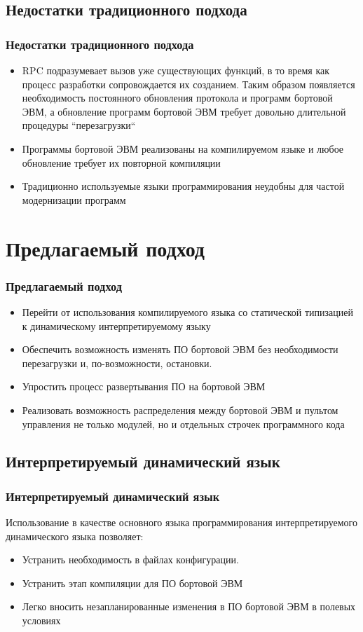 \documentclass{beamer}
\begin{document}
\subsection{Недостатки традиционного подхода}
\begin{frame}
\frametitle{Недостатки традиционного подхода}
\begin{itemize}
  \item<1-> RPC подразумевает вызов уже существующих функций, в то время как
  процесс разработки сопровождается их созданием. Таким образом появляется
  необходимость постоянного обновления протокола и программ бортовой ЭВМ, а 
  обновление программ бортовой ЭВМ требует довольно длительной
  процедуры ``перезагрузки``  
  \item<1->Программы бортовой ЭВМ реализованы на компилируемом языке и
  любое обновление требует их повторной компиляции
  \item<1-> Традиционно используемые языки программирования неудобны для частой
  модернизации программ
\end{itemize}
\end{frame}

\section{Предлагаемый подход}
\begin{frame}
\frametitle{Предлагаемый подход}
\begin{itemize}
  \item<1>Перейти от использования компилируемого языка со статической
  типизацией к динамическому интерпретируемому языку
  \item<1>Обеспечить возможность изменять ПО бортовой ЭВМ без необходимости
  перезагрузки и, по-возможности, остановки.
  \item<1>Упростить процесс развертывания ПО на бортовой ЭВМ
  \item<1>Реализовать возможность распределения между бортовой ЭВМ и пультом
  управления не только модулей, но и отдельных строчек программного кода 
\end{itemize}
\end{frame}

\subsection{Интерпретируемый динамический язык}
\begin{frame}
\frametitle{Интерпретируемый динамический язык}
Использование в качестве основного языка программирования 
интерпретируемого динамического языка позволяет:
\begin{itemize}
  \item<1-> Устранить необходимость в файлах конфигурации.   
  \item<1-> Устранить этап компиляции для ПО бортовой ЭВМ
  \item<1-> Легко вносить незапланированные изменения в ПО бортовой ЭВМ в
  полевых условиях
\end{itemize}

\end{frame}
\end{document}

